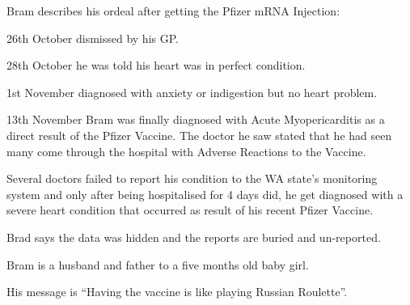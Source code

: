 Bram describes his ordeal after getting the Pfizer mRNA Injection:

26th October dismissed by his GP.

28th October he was told his heart was in perfect condition.

1st November diagnosed with anxiety or indigestion but no heart problem.

13th November Bram was finally diagnosed with Acute Myopericarditis as a direct
result of the Pfizer Vaccine. The doctor he saw stated that he had seen many
come through the hospital with Adverse Reactions to the Vaccine.

Several doctors failed to report his condition to the WA state’s monitoring
system and only after being hospitalised for 4 days did, he get diagnosed with a
severe heart condition that occurred as result of his recent Pfizer Vaccine.

Brad says the data was hidden and the reports are buried and un-reported.

Bram is a husband and father to a five months old baby girl.

His message is “Having the vaccine is like playing Russian Roulette”.

